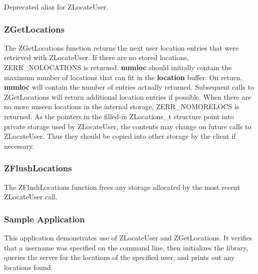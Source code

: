 Deprecated alias for ZLocateUser.

\subsubsection{ZGetLocations}
\label{ZGetLocations}

\etemplate
{}

The ZGetLocations function returns the next user location entries that
were retrieved with ZLocateUser.  If there are no stored locations,
ZERR_NOLOCATIONS is returned.  {\bf *numloc} should initially contain
the maximum number of locations that can fit in the {\bf location}
buffer.  On return, {\bf *numloc} will contain the number of entries
actually returned.  Subsequent calls to ZGetLocations will return
additional location entries if possible.  When there are no more unseen
locations in the internal storage, ZERR_NOMORELOCS is returned.  As the
pointers in the filled-in ZLocations_t structure point into private
storage used by ZLocateUser, the contents may change on future calls to
ZLocateUser.  Thus they should be copied into other storage by the
client if necessary.

\subsubsection{ZFlushLocations}
\label{ZFlushLocations}

\etemplate
{}

The ZFlushLocations function frees any storage allocated by the
most recent ZLocateUser call.

\subsubsection{Sample Application}

This application demonstrates use of ZLocateUser and ZGetLocations.  It
verifies that a username was specified on the command line, then
initializes the library, queries the server for the locations of the
specified user, and prints out any locations found.

